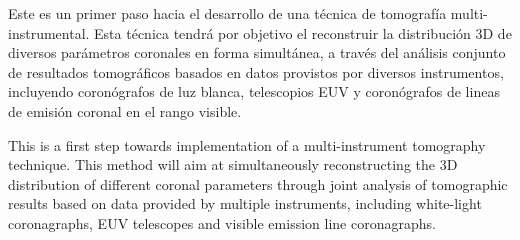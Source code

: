 
Este es un primer paso hacia el desarrollo de una técnica de tomografía multi-instrumental. Esta técnica tendrá por objetivo el reconstruir la distribución 3D de diversos parámetros coronales en forma simultánea, a través del análisis conjunto de resultados tomográficos basados en datos provistos por diversos instrumentos, incluyendo coronógrafos de luz blanca, telescopios EUV y coronógrafos de lineas de emisión coronal en el rango visible.
 
 This is a first step towards implementation of a multi-instrument tomography technique. This method will aim at simultaneously reconstructing the 3D distribution of different coronal parameters through joint analysis of tomographic results based on data provided by multiple instruments, including white-light coronagraphs, EUV telescopes and visible emission line coronagraphs.

 
